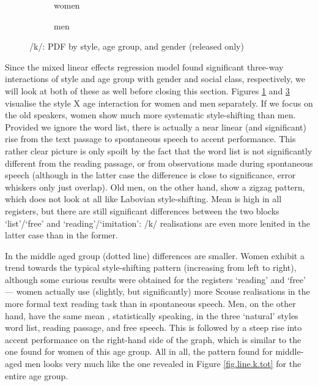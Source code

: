 \begin{figure}[h]
	\centering
	\begin{subfigure}{.49\textwidth}
		\centering
			\resizebox{\linewidth}{!}{} 
		\caption{women}
		\label{fig.line.k.fem}
	\end{subfigure}
	\begin{subfigure}{.49\textwidth}
		\centering
			\resizebox{\linewidth}{!}{} 
		\caption{men}
		\label{fig.line.k.mal}
	\end{subfigure}
	\caption{/k/: PDF by style, age group, and gender (released only)}
\end{figure}

Since the mixed linear effects regression model found significant three-way interactions of style and age group with gender and social class, respectively, we will look at both of these as well before closing this section.
Figures \ref{fig.line.k.fem} and \ref{fig.line.k.mal} visualise the style X age interaction for women and men separately.
If we focus on the old speakers, women show much more systematic style-shifting than men.
Provided we ignore the word list, there is actually a near linear (and significant) rise from the text passage to spontaneous speech to accent performance.
This rather clear picture is only spoilt by the fact that the word list is not significantly different from the reading passage, or from observations made during spontaneous speech (although in the latter case the difference is close to significance, error whiskers only just overlap).
Old men, on the other hand, show a zigzag pattern, which does not look at all like Labovian style-shifting.
Mean  is high in all registers, but there are still significant differences between the two blocks `list'/`free' and `reading'/`imitation': /k/ realisations are even more lenited in the latter case than in the former.

In the middle aged group (dotted line) differences are smaller.
Women exhibit a trend towards the typical style-shifting pattern (increasing  from left to right), although some curious results were obtained for the registers `reading' and `free' --- women actually use (slightly, but significantly) more Scouse realisations in the more formal text reading task than in spontaneous speech.
Men, on the other hand, have the same mean , statistically speaking, in the three `natural' styles word list, reading passage, and free speech.
This is followed by a steep rise into accent performance on the right-hand side of the graph, which is similar to the one found for women of this age group.
All in all, the pattern found for middle-aged men looks very much like the one revealed in Figure \ref{fig.line.k.tot} for the entire age group.

